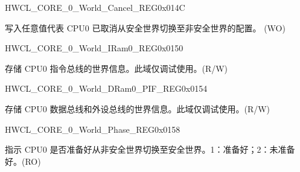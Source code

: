 \begin{register}{H}{WCL\_CORE\_0\_World\_Cancel\_REG}{0x{}014C}\label{regdesc:WCLCORE0WORLDCANCELREG}
%
\regnewline%
\begin{regdesc}\begin{reglist}
\label{fielddesc:WCLCORE0WORLDCANCEL}\item [WCL\_CORE\_0\_WORLD\_CANCEL] 写入任意值代表 CPU0 已取消从安全世界切换至非安全世界的配置。 (WO)
\end{reglist}\end{regdesc}
\end{register}


\begin{register}{H}{WCL\_CORE\_0\_World\_IRam0\_REG}{0x{}0150}\label{regdesc:WCLCORE0WORLDIRAM0REG}
%
%
\regnewline%
\begin{regdesc}\begin{reglist}
\label{fielddesc:WCLCORE0WORLDIRAM0}\item [WCL\_CORE\_0\_WORLD\_IRAM0] 存储 CPU0 指令总线的世界信息。此域仅调试使用。(R/W)
\end{reglist}\end{regdesc}
\end{register}


\begin{register}{H}{WCL\_CORE\_0\_World\_DRam0\_PIF\_REG}{0x{}0154}\label{regdesc:WCLCORE0WORLDDRAM0PIFREG}
%
%
\regnewline%
\begin{regdesc}\begin{reglist}
\label{fielddesc:WCLCORE0WORLDDRAM0PIF}\item [WCL\_CORE\_0\_WORLD\_DRAM0\_PIF] 存储 CPU0 数据总线和外设总线的世界信息。此域仅调试使用。(R/W)
\end{reglist}\end{regdesc}
\end{register}


\begin{register}{H}{WCL\_CORE\_0\_World\_Phase\_REG}{0x{}0158}\label{regdesc:WCLCORE0WORLDPHASEREG}
%
%
\regnewline%
\begin{regdesc}\begin{reglist}
\label{fielddesc:WCLCORE0WORLDPHASE}\item [WCL\_CORE\_0\_WORLD\_PHASE] 指示 CPU0 是否准备好从非安全世界切换至安全世界。1：准备好；2：未准备好。(RO)
\end{reglist}\end{regdesc}
\end{register}

